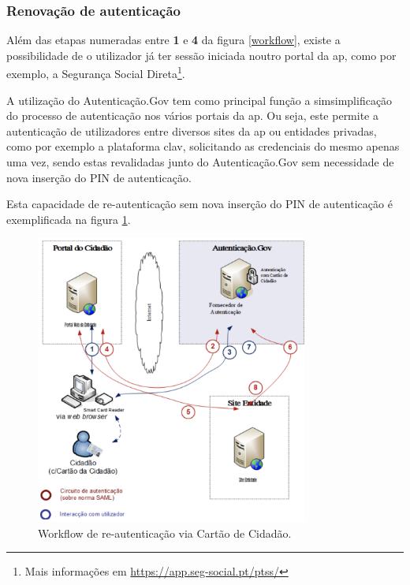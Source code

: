 \subsubsection{Renovação de autenticação} \label{renovacaoAuth}

Além das etapas numeradas entre \textbf{1} e \textbf{4} da figura \ref{workflow}, existe a possibilidade de o utilizador já ter sessão iniciada noutro portal da \gls{ap}, como por exemplo, a Segurança Social Direta\footnote{Mais informações em \url{https://app.seg-social.pt/ptss/}}.

A utilização do Autenticação.Gov tem como principal função a simsimplificação do processo de autenticação nos vários portais da \gls{ap}. Ou seja, este permite a autenticação de utilizadores entre diversos sites da \gls{ap} ou entidades privadas, como por exemplo a plataforma \gls{clav}, solicitando as credenciais do mesmo apenas uma vez, sendo estas revalidadas junto do Autenticação.Gov sem necessidade de nova inserção do PIN de autenticação.

Esta capacidade de re-autenticação sem nova inserção do PIN de autenticação é exemplificada na figura \ref{workflow2}.

\begin{figure}[h]
    \centering
    \includegraphics[width=0.8\textwidth]{img/authgov/workflow2.png}
    \caption{Workflow de re-autenticação via Cartão de Cidadão.}
    \label{workflow2}
\end{figure}

